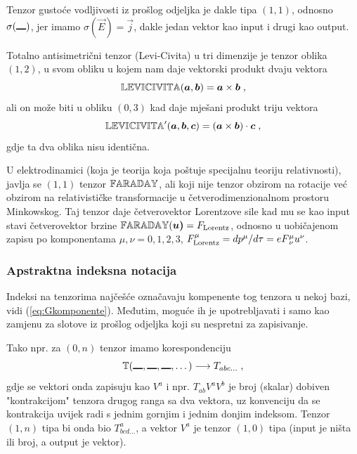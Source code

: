 Tenzor gustoće vodljivosti iz prošlog odjeljka je dakle
tipa $(1,1)$, odnosno $\sigma(\slot)$, jer imamo
$\sigma(\vec{E}) = \vec{j}$, dakle jedan vektor kao input
i drugi kao output.

Totalno antisimetrični tenzor (Levi-Civita) u tri dimenzije je
tenzor oblika $(1, 2)$, u svom obliku u kojem nam daje
vektorski produkt dvaju vektora 
\begin{equation}
   \bbtensor{LEVICIVITA}(\vec{a}, \vec{b}) = \vec{a}\times\vec{b} \;,
\end{equation}
ali on može biti u obliku $(0, 3)$ kad daje mješani produkt 
triju vektora
\begin{equation}
   \bbtensor{LEVICIVITA}'(\vec{a}, \vec{b}, \vec{c}) =
 (\vec{a}\times\vec{b})\cdot\vec{c} \;,
\end{equation}
gdje ta dva oblika nisu identična.

U elektrodinamici (koja je teorija koja poštuje specijalnu teoriju
relativnosti), javlja se $(1,1)$ tenzor $\mathbb{FARADAY}$, ali koji
nije tenzor obzirom na rotacije 
već obzirom na relativističke transformacije u četverodimenzionalnom
prostoru Minkowskog. Taj tenzor daje četverovektor Lorentzove sile
kad mu se kao input stavi četverovektor brzine
$\bbtensor{FARADAY}(\vec{u)} = F_{\rm Lorentz}$, odnosno u uobičajenom
zapisu po komponentama $\mu, \nu = 0,1,2,3$, 
$F^{\mu}_{\rm Lorentz} = d p^{\mu}/d\tau = e F^{\mu}_{\,\nu} u^\nu$.


\subsubsection*{Apstraktna indeksna notacija}

Indeksi na tenzorima najčešće označavaju kompenente tog tenzora
u nekoj bazi, vidi (\ref{eq:Gkomponente}). Međutim, moguće ih
je upotrebljavati i samo kao zamjenu za slotove iz prošlog
odjeljka koji su nespretni za zapisivanje.

Tako npr.  za $(0, n)$ tenzor imamo korespondenciju
\begin{equation}
\bbtensor{T}(\slot,\slot,\slot, \dots)  \longrightarrow T_{abc\dots} \;,
\end{equation}
gdje se vektori onda zapisuju kao $V^a$ i npr.  $T_{ab}V^{a}V^{b}$ je
broj (skalar) dobiven "kontrakcijom" tenzora drugog ranga sa
dva vektora, uz konvenciju da se kontrakcija uvijek radi s jednim
gornjim i jednim donjim indeksom. Tenzor $(1,n)$ tipa bi onda bio
$T^{a}_{bcd\dots}$, a vektor $V^a$ je tenzor $(1,0)$ tipa (input
je ništa ili broj, a output je vektor).

